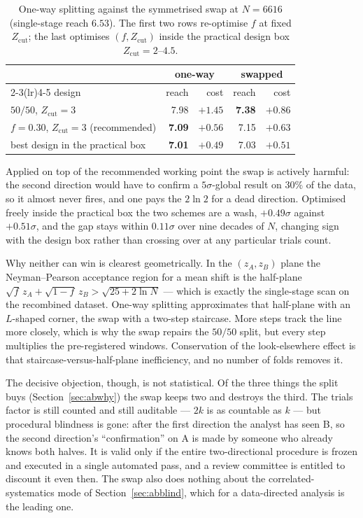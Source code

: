 \begin{table}[htbp]
\centering
\caption{One-way splitting against the symmetrised swap at $N = 6616$ (single-stage reach
$6.53$). The first two rows re-optimise $f$ at fixed $Z_{\mathrm{cut}}$; the last optimises
$(f, Z_{\mathrm{cut}})$ inside the practical design box $Z_{\mathrm{cut}} = 2$--$4.5$.}
\label{tab:abswap}
\begin{tabular}{lrrrr}
\toprule
 & \multicolumn{2}{c}{one-way} & \multicolumn{2}{c}{swapped} \\
\cmidrule(lr){2-3}\cmidrule(lr){4-5}
design & reach & cost & reach & cost \\
\midrule
$50/50$, $Z_{\mathrm{cut}} = 3$ & 7.98 & $+1.45$ & \textbf{7.38} & $\mathbf{+0.86}$ \\
$f = 0.30$, $Z_{\mathrm{cut}} = 3$ (recommended) & \textbf{7.09} & $\mathbf{+0.56}$ & 7.15 & $+0.63$ \\
best design in the practical box & \textbf{7.01} & $\mathbf{+0.49}$ & 7.03 & $+0.51$ \\
\bottomrule
\end{tabular}
\end{table}

Applied on top of the recommended working point the swap is actively harmful: the second
direction would have to confirm a $5\sigma$-global result on $30\%$ of the data, so it almost
never fires, and one pays the $2\ln 2$ for a dead direction. Optimised freely inside the
practical box the two schemes are a wash, $+0.49\sigma$ against $+0.51\sigma$, and the gap stays
within $0.11\sigma$ over nine decades of $N$, changing sign with the design box rather than
crossing over at any particular trials count.

Why neither can win is clearest geometrically. In the $(z_A, z_B)$ plane the Neyman--Pearson
acceptance region for a mean shift is the half-plane
$\sqrt{f}\,z_A + \sqrt{1-f}\,z_B > \sqrt{25 + 2\ln N}$ --- which is exactly the single-stage scan
on the recombined dataset. One-way splitting approximates that half-plane with an $L$-shaped
corner, the swap with a two-step staircase. More steps track the line more closely, which is why
the swap repairs the $50/50$ split, but every step multiplies the pre-registered windows.
Conservation of the look-elsewhere effect is that staircase-versus-half-plane inefficiency, and no
number of folds removes it.

The decisive objection, though, is not statistical. Of the three things the split buys
(Section~\ref{sec:abwhy}) the swap keeps two and destroys the third. The trials factor is still
counted and still auditable --- $2k$ is as countable as $k$ --- but procedural blindness is gone:
after the first direction the analyst has seen B, so the second direction's ``confirmation'' on A
is made by someone who already knows both halves. It is valid only if the entire two-directional
procedure is frozen and executed in a single automated pass, and a review committee is entitled to
discount it even then. The swap also does nothing about the correlated-systematics mode of
Section~\ref{sec:abblind}, which for a data-directed analysis is the leading one.

